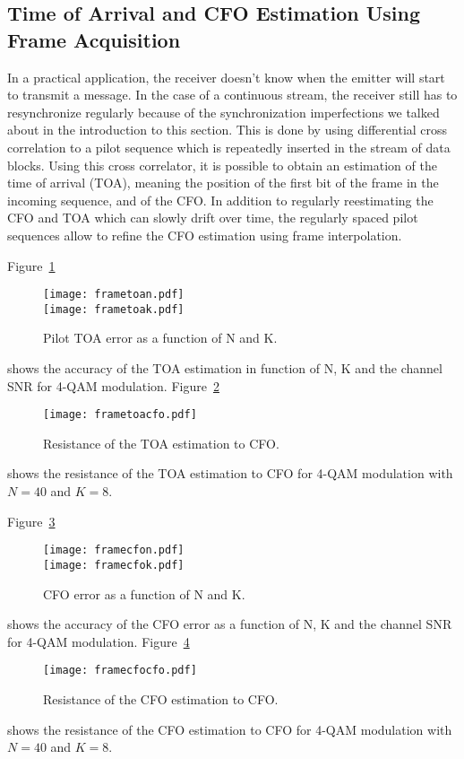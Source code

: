 \subsection{Time of Arrival and CFO Estimation Using Frame Acquisition}
In a practical application, the receiver doesn't know when the emitter will start to transmit a message.
In the case of a continuous stream, the receiver still has to resynchronize regularly because of the synchronization imperfections we talked about in the introduction to this section.
This is done by using differential cross correlation to a pilot sequence which is repeatedly inserted in the stream of data blocks.
Using this cross correlator, it is possible to obtain an estimation of the time of arrival (TOA), meaning the position of the first bit of the frame in the incoming sequence, and of the CFO.
In addition to regularly reestimating the CFO and TOA which can slowly drift over time, the regularly spaced pilot sequences allow to refine the CFO estimation using frame interpolation.

Figure~\ref{fig:frametoa}
\begin{figure}
  \centering
  \texttt{[image: frametoan.pdf]}
  \\\texttt{[image: frametoak.pdf]}
  \caption{Pilot TOA error as a function of N and K.\label{fig:frametoa}}
\end{figure}
shows the accuracy of the TOA estimation in function of N, K and the channel SNR for 4-QAM modulation.
Figure~\ref{fig:frametoacfo}
\begin{figure}
  \centering
  \texttt{[image: frametoacfo.pdf]}
  \caption{Resistance of the TOA estimation to CFO.\label{fig:frametoacfo}}
\end{figure}
shows the resistance of the TOA estimation to CFO for 4-QAM modulation with $N = 40$ and $K=8$.

Figure~\ref{fig:framecfo}
\begin{figure}
  \centering
  \texttt{[image: framecfon.pdf]}
  \\\texttt{[image: framecfok.pdf]}
  \caption{CFO error as a function of N and K.\label{fig:framecfo}}
\end{figure}
shows the accuracy of the CFO error as a function of N, K and the channel SNR for 4-QAM modulation.
Figure~\ref{fig:framecfocfo}
\begin{figure}
  \centering
  \texttt{[image: framecfocfo.pdf]}
  \caption{Resistance of the CFO estimation to CFO.\label{fig:framecfocfo}}
\end{figure}
shows the resistance of the CFO estimation to CFO for 4-QAM modulation with $N = 40$ and $K=8$.

